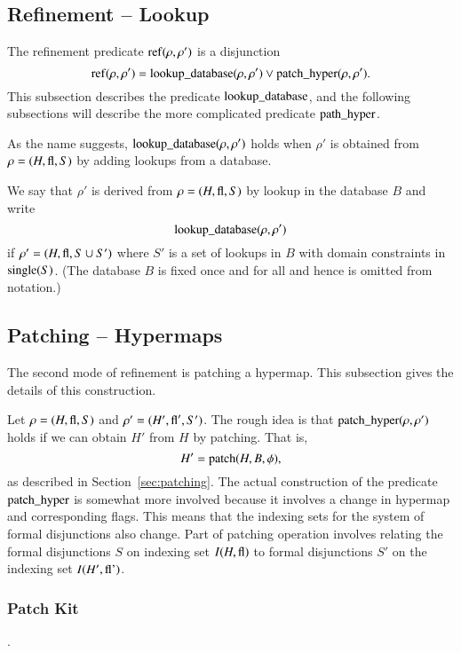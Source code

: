 \subsection{Refinement -- Lookup}
%
\label{sec:refine}

The refinement predicate ${\operatorname{ref}}(\rho,\rho')$ is a disjunction
    \begin{equation}
    {\operatorname{ref}}(\rho,\rho') =
    {\operatorname{lookup\_database}}(\rho,\rho')\vee
    {\operatorname{patch\_hyper}}(\rho,\rho').
    \end{equation}
This subsection describes the predicate ${\operatorname{lookup\_database}}$,
and the following subsections  will describe the more complicated
predicate ${\operatorname{path\_hyper}}$.

As the name suggests, ${\operatorname{lookup\_database}}(\rho,\rho')$ holds
when $\rho'$ is obtained from $\rho=(H,{\operatorname{fl}},S)$ by adding
lookups from a database.

\begin{definition}
We say that $\rho'$ is derived from $\rho=(H,{\operatorname{fl}},S)$ by lookup
in the database $B$ and write
    $${\operatorname{lookup\_database}}(\rho,\rho')$$
if $\rho' = (H,{\operatorname{fl}},S \cup S')$ where $S'$ is a set of lookups
in $B$ with domain constraints in ${\operatorname{single}}(S)$. (The database
$B$ is fixed once and for all and hence is omitted from notation.)
\end{definition}

\subsection{Patching -- Hypermaps}

The second mode of refinement is patching a hypermap.  This
subsection gives the details of this construction.

Let $\rho=(H,{\operatorname{fl}},S)$ and $\rho'=(H',{\operatorname{fl}}',S')$.   The rough
idea is that ${\operatorname{patch\_hyper}}(\rho,\rho')$ holds if we can
obtain $H'$ from $H$ by patching. That is,
    $$H' = {\operatorname{patch}}(H,B,\phi),
    $$
as described in Section~\ref{sec:patching}. The actual
construction of the predicate ${\operatorname{patch\_hyper}}$ is somewhat more
involved because it involves a change in hypermap and
corresponding flags. This means that the indexing sets for the
system of formal disjunctions also change.  Part of patching
operation involves relating the formal disjunctions $S$ on
indexing set $I(H,{\operatorname{fl}})$ to formal disjunctions $S'$ on the
indexing set $I(H',{\operatorname{fl'}})$.

\subsubsection{Patch Kit}.



